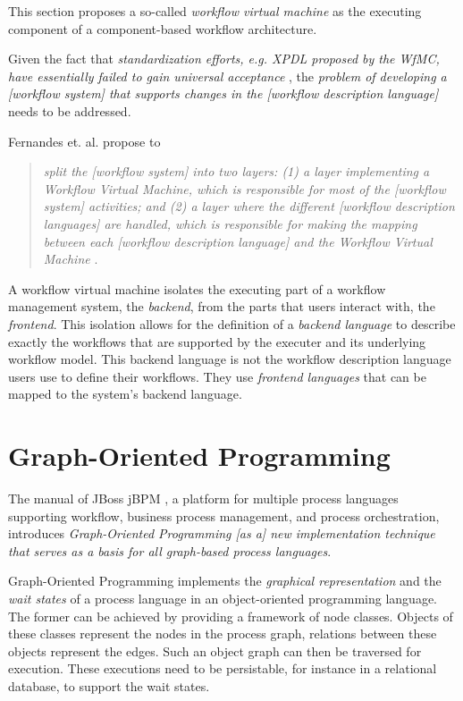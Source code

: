 This section proposes a so-called \emph{workflow virtual machine} as the
executing component of a component-based workflow architecture.

Given the fact that \emph{standardization efforts, e.g. XPDL \cite{WfMC05}
proposed by the WfMC, have essentially failed to gain universal acceptance}
\cite{WA04}, the \emph{problem of developing a [workflow system] that supports
changes in the [workflow description language]} needs to be addressed.

Fernandes et. al. propose to

\begin{quote}
\emph{split the [workflow system] into two layers: (1) a layer implementing
a \emph{Workflow Virtual Machine}, which is responsible for most of the
[workflow system] activities; and (2) a layer where the different [workflow
description languages] are handled, which is responsible for making the
mapping between each [workflow description language] and the Workflow Virtual
Machine} \cite{SF04}.
\end{quote}

A workflow virtual machine isolates the executing part of a workflow
management system, the \emph{backend}, from the parts that users interact
with, the \emph{frontend}. This isolation allows for the definition of a
\emph{backend language} to describe exactly the workflows that are supported
by the executer and its underlying workflow model. This backend language is
not the workflow description language users use to define their workflows.
They use \emph{frontend languages} that can be mapped to the system's
backend language.

\section{Graph-Oriented Programming}
\label{section-GraphOrientedProgramming}

The manual of JBoss jBPM \cite{JBOSS}, a platform for multiple process
languages supporting workflow, business process management, and process
orchestration, introduces \emph{Graph-Oriented Programming [as a] new
implementation technique that serves as a basis for all graph-based process
languages}.

Graph-Oriented Programming implements the \emph{graphical representation} and
the \emph{wait states} of a process language in an object-oriented programming
language. The former can be achieved by providing a framework of node classes.
Objects of these classes represent the nodes in the process graph, relations
between these objects represent the edges. Such an object graph can then be
traversed for execution. These executions need to be persistable, for instance
in a relational database, to support the wait states.

